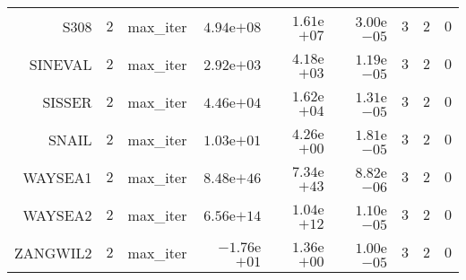 \begin{longtable}{rrrrrrrrr}
S308 & \(     2\) & max\_iter & \( 4.94\)e\(+08\) & \( 1.61\)e\(+07\) & \( 3.00\)e\(-05\) & \(     3\) & \(     2\) & \(     0\) \\
SINEVAL & \(     2\) & max\_iter & \( 2.92\)e\(+03\) & \( 4.18\)e\(+03\) & \( 1.19\)e\(-05\) & \(     3\) & \(     2\) & \(     0\) \\
SISSER & \(     2\) & max\_iter & \( 4.46\)e\(+04\) & \( 1.62\)e\(+04\) & \( 1.31\)e\(-05\) & \(     3\) & \(     2\) & \(     0\) \\
SNAIL & \(     2\) & max\_iter & \( 1.03\)e\(+01\) & \( 4.26\)e\(+00\) & \( 1.81\)e\(-05\) & \(     3\) & \(     2\) & \(     0\) \\
WAYSEA1 & \(     2\) & max\_iter & \( 8.48\)e\(+46\) & \( 7.34\)e\(+43\) & \( 8.82\)e\(-06\) & \(     3\) & \(     2\) & \(     0\) \\
WAYSEA2 & \(     2\) & max\_iter & \( 6.56\)e\(+14\) & \( 1.04\)e\(+12\) & \( 1.10\)e\(-05\) & \(     3\) & \(     2\) & \(     0\) \\
ZANGWIL2 & \(     2\) & max\_iter & \(-1.76\)e\(+01\) & \( 1.36\)e\(+00\) & \( 1.00\)e\(-05\) & \(     3\) & \(     2\) & \(     0\) \\\hline
\end{longtable}

